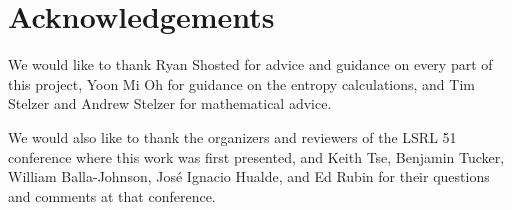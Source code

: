 \documentclass[12pt,twoside]{article}
\begin{document}
\section*{Acknowledgements}

We would like to thank Ryan Shosted for advice and guidance on every part of this project, Yoon Mi Oh for guidance on the entropy calculations, and Tim Stelzer and Andrew Stelzer for mathematical advice.

We would also like to thank the organizers and reviewers of the LSRL 51 conference where this work was first presented, and Keith Tse, Benjamin Tucker, William Balla-Johnson, José Ignacio Hualde, and Ed Rubin for their questions and comments at that conference.

\label{sec:refs}
\printbibliography
\end{document}
